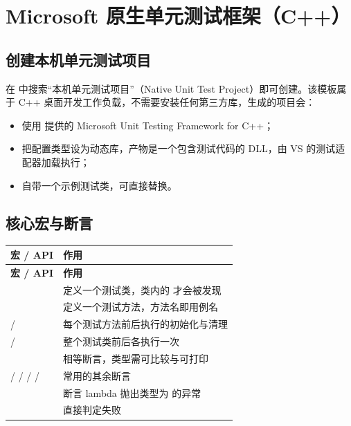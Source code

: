 \section{Microsoft 原生单元测试框架（C++）}

\subsection{创建本机单元测试项目}

在  中搜索“本机单元测试项目”（Native Unit Test Project）即可创建。该模板属于 C++ 桌面开发工作负载，不需要安装任何第三方库，生成的项目会：

\begin{itemize}
  \item 使用  提供的 Microsoft Unit Testing Framework for C++；
  \item 把配置类型设为动态库，产物是一个包含测试代码的 DLL，由 VS 的测试适配器加载执行；
  \item 自带一个示例测试类，可直接替换。
\end{itemize}

\subsection{核心宏与断言}

\begin{longtable}{L{7.6cm}L{7.4cm}}
\toprule \textbf{宏 / API} & \textbf{作用} \\ \midrule
\endfirsthead
\toprule \textbf{宏 / API} & \textbf{作用} \\ \midrule
\endhead
\bottomrule \endlastfoot
{} & 定义一个测试类，类内的  才会被发现 \\
 & 定义一个测试方法，方法名即用例名 \\
 /  & 每个测试方法前后执行的初始化与清理 \\
 /  & 整个测试类前后各执行一次 \\
 & 相等断言，类型需可比较与可打印 \\
 /  /  /  /  & 常用的其余断言 \\
\allowbreak{} & 断言 lambda 抛出类型为  的异常 \\
 & 直接判定失败 \\
\end{longtable}

